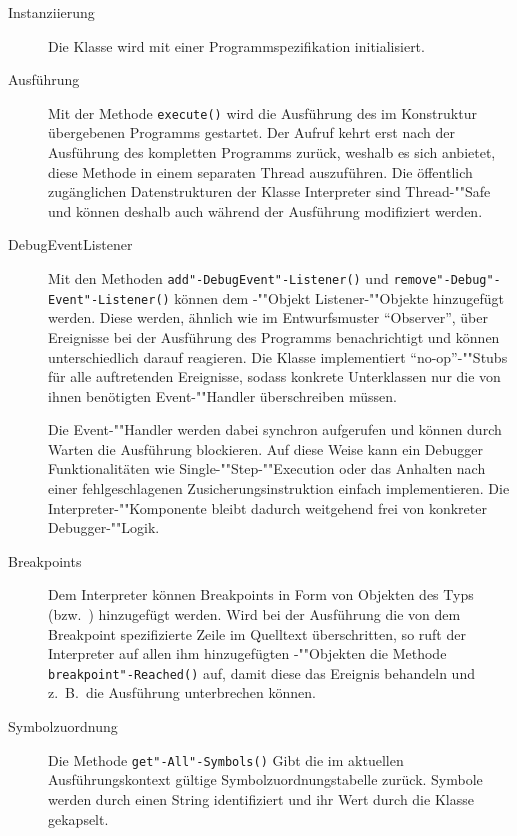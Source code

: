 \begin{description}
    \item[Instanziierung] Die Klasse  wird mit einer Programmspezifikation initialisiert.

    \item[Ausführung] Mit der Methode \texttt{execute()} wird die Ausführung des im Konstruktur übergebenen Programms gestartet. Der Aufruf kehrt erst nach der Ausführung des kompletten Programms zurück, weshalb es sich anbietet, diese Methode in einem separaten Thread auszuführen. Die öffentlich zugänglichen Datenstrukturen der Klasse Interpreter sind Thread-""Safe und können deshalb auch während der Ausführung modifiziert werden.

    \item[DebugEventListener]
    Mit den Methoden \texttt{add"-DebugEvent"-Listener()} und \texttt{remove"-Debug"-Event"-Listener()} können dem -""Objekt Listener-""Objekte hinzugefügt werden. Diese werden, ähnlich wie im Entwurfsmuster ``Observer'', über Ereignisse bei der Ausführung des Programms benachrichtigt und können unterschiedlich darauf reagieren. Die Klasse  implementiert ``no-op''-""Stubs für alle auftretenden Ereignisse, sodass konkrete Unterklassen nur die von ihnen benötigten Event-""Handler überschreiben müssen.

    Die Event-""Handler werden dabei synchron aufgerufen und können durch Warten die Ausführung blockieren. Auf diese Weise kann ein Debugger Funktionalitäten wie Single-""Step-""Execution oder das Anhalten nach einer fehlgeschlagenen Zusicherungsinstruktion einfach implementieren. Die Interpreter-""Komponente bleibt dadurch weitgehend frei von konkreter Debugger-""Logik.

    \item[Breakpoints]
    Dem Interpreter können Breakpoints in Form von Objekten des Typs  (bzw.\ ) hinzugefügt werden. Wird bei der Ausführung die von dem Breakpoint spezifizierte Zeile im Quelltext überschritten, so ruft der Interpreter auf allen ihm hinzugefügten -""Objekten die Methode \texttt{breakpoint"-Reached()} auf, damit diese das Ereignis behandeln und z.~B.\ die Ausführung unterbrechen können.

    \item[Symbolzuordnung]
    Die Methode \texttt{get"-All"-Symbols()} Gibt die im aktuellen Ausführungskontext gültige Symbolzuordnungstabelle zurück. Symbole werden durch einen String identifiziert und ihr Wert durch die Klasse  gekapselt.


\end{description}
